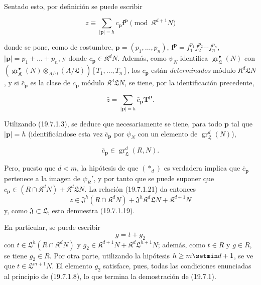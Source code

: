 Sentado esto, por definición se puede escribir
\begin{env}[19.7.1.21]
\label{IV.19.7.1.21}
\[
  z\equiv\sum_{|\mathbf p|=h}c_{\mathbf p}\mathbf f^{\mathbf p}\pmod{\mathfrak K^{d+1}N}
\]
\end{env}
donde se pone, como de costumbre, $\mathbf p=(p_1,\ldots,p_n)$, $\mathbf f^{\mathbf p}=f_1^{p_1}f_2^{p_2}\cdots f_n^{p_n}$, $|\mathbf p|=p_1+\ldots+p_n$, y donde $c_{\mathbf p}\in\mathfrak K^dN$. Además, como $\psi_N$ identifica $\operatorname{gr}_{\mathfrak L}^\bullet(N)$ con $(\operatorname{gr}_{\mathfrak K}^\bullet(N)\otimes_{A/\mathfrak K}(A/\mathfrak L))[T_1,\ldots,T_n]$, los $c_{\mathbf p}$ están \emph{determinados} módulo $\mathfrak K^d\mathfrak LN$, y si $\bar c_{\mathbf p}$ es la clase de $c_{\mathbf p}$ módulo $\mathfrak K^d\mathfrak LN$, se tiene, por la identificación precedente,
\begin{env}[19.7.1.22]
\label{IV.19.7.1.22}
\[
  \bar z=\sum_{|\mathbf p|=h}\bar c_{\mathbf p}\mathbf T^{\mathbf p}.
\]
\end{env}
Utilizando (19.7.1.3), se deduce que necesariamente se tiene, para todo $\mathbf p$ tal que $|\mathbf p|=h$ (identificándose esta vez $\bar c_{\mathbf p}$ por $\psi_N$ con un elemento de $\operatorname{gr}_{\mathfrak L}^d(N)$),
\begin{env}[19.7.1.23]
\label{IV.19.7.1.23}
\[
  \bar c_{\mathbf p}\in\operatorname{gr}_{\mathfrak L}^d(R,N).
\]
\end{env}
Pero, puesto que $d<m$, la hipótesis de que $(*_d)$ es verdadera implica que $\bar c_{\mathbf p}$ pertenece a la imagen de $\psi_R'$, y por tanto que se puede suponer que $c_{\mathbf p}\in(R\cap\mathfrak K^dN)+\mathfrak K^d\mathfrak LN$. La relación (19.7.1.21) da entonces
\[
  z\in\mathfrak J^h(R\cap\mathfrak K^dN)+\mathfrak J^h\mathfrak K^d\mathfrak LN+\mathfrak K^{d+1}N
\]
y, como $\mathfrak J\subset\mathfrak L$, esto demuestra (19.7.1.19).


En particular, se puede escribir
\[
  g=t+g_2
\]
con $t\in\mathfrak L^h(R\cap\mathfrak K^dN)$ y $g_2\in\mathfrak K^{d+1}N+\mathfrak K^d\mathfrak L^{h+1}N$; además, como $t\in R$ y $g\in R$, se tiene $g_2\in R$. Por otra parte, utilizando la hipótesis $h\geq m\setmin d+1$, se ve que $t\in\mathfrak L^{m+1}N$. El elemento $g_2$ satisface, pues, todas las condiciones enunciadas al principio de (19.7.1.8), lo que termina la demostración de (19.7.1).

